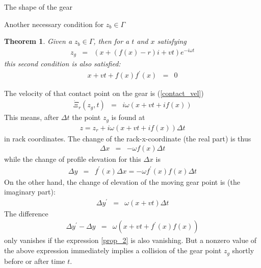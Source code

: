 \documentclass[a4paper,fleqn]{article}
\newtheorem{theorem}{Theorem}[section]
\newenvironment{proof}[1][Proof]{\begin{trivlist}
\item[\hskip \labelsep {\bfseries #1}]}{\end{trivlist}}
\newcommand{\qed}{\nobreak \ifvmode \relax \else
      \ifdim\lastskip<1.5em \hskip-\lastskip
      \hskip1.5em plus0em minus0.5em \fi \nobreak
      \vrule height0.75em width0.5em depth0.25em\fi}
\numberwithin{equation}{section}
\begin{document}
\begin{subsection}{The shape of the gear}
\begin{subsubsection}{Another necessary condition for $z_b\in \Gamma$}
\begin{theorem}
Given a $z_b\in \Gamma$, then for a $t$ and $x$ satisfying
\begin{eqnarray}
z_g &=& (x+(f(x)-r)i+vt)e^{-i\omega t} 
\end{eqnarray}
this second condition is also satisfied:
\begin{eqnarray}
\label{prop_2}
x+vt+f(x)f^\prime(x) &=& 0
\end{eqnarray}
\end{theorem}
\begin{proof}
The velocity of that contact point on the gear is (\ref{contact_vel})
\begin{eqnarray}
	\dot{\Xi}_r(z_g,t) &=& i\omega( x+vt+if(x))
\end{eqnarray}
This means, after $\Delta t$ the point $z_g$ is found at 
\begin{eqnarray}
	z = z_r + i\omega( x+vt+if(x))\Delta t
\end{eqnarray}
in rack coordinates. The change of the rack-x-coordinate (the real part) is thus
\begin{eqnarray}
\Delta x &=& -\omega f(x) \Delta t
\end{eqnarray}
while the change of profile elevation for this $\Delta x$ is
\begin{eqnarray}
	\Delta y &=& f^\prime(x)\Delta x = -\omega f^\prime(x)f(x)\Delta t
\end{eqnarray}
On the other hand, the change of elevation of the moving gear point is (the imaginary part):
\begin{eqnarray}
	\Delta y^\prime &=& \omega (x+vt) \Delta t
\end{eqnarray}
The difference
\begin{eqnarray}
	\Delta y^\prime-\Delta y &=& \omega(x+vt+f^\prime(x)f(x))
\end{eqnarray}
only vanishes if the expression \ref{prop_2} is also vanishing. But a nonzero value of the above expression immediately implies a collision of the gear point $z_g$ shortly before or after time $t$.
\qed
\end{proof}
\end{subsubsection}
\end{subsection}
\end{document}
